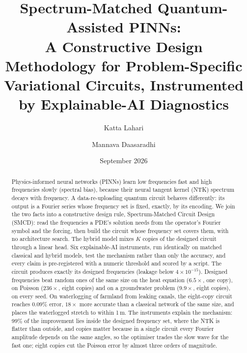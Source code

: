 \documentclass[11pt]{article}
\title{Spectrum-Matched Quantum-Assisted PINNs:\\
  A Constructive Design Methodology for Problem-Specific\\
  Variational Circuits, Instrumented by Explainable-AI Diagnostics}
\author{Katta Lahari \and Mannava Daasaradhi}
\date{September 2026}
\begin{document}
\maketitle

\begin{abstract}
Physics-informed neural networks (PINNs) learn low frequencies fast and high
frequencies slowly (spectral bias), because their neural tangent kernel (NTK) spectrum
decays with frequency. A data-re-uploading quantum circuit behaves differently: its
output is a Fourier series whose frequency set is fixed, exactly, by its encoding. We
join the two facts into a constructive design rule, Spectrum-Matched Circuit Design
(SMCD): read the frequencies a PDE's solution needs from the operator's Fourier symbol
and the forcing, then build the circuit whose frequency set covers them, with no
architecture search. The hybrid model mixes $K$ copies of the designed circuit through a
linear head. Six explainable-AI instruments, run identically on matched classical and
hybrid models, test the mechanism rather than only the accuracy, and every claim is
pre-registered with a numeric threshold and scored by a script. The circuit produces
exactly its designed frequencies (leakage below $4\times10^{-15}$). Designed frequencies
beat random ones of the same size on the heat equation ($6.5\times$, one copy), on
Poisson ($236\times$, eight copies) and on a groundwater problem ($9.9\times$, eight
copies), on every seed. On waterlogging of farmland from leaking canals, the eight-copy
circuit reaches 0.09\% error, $18\times$ more accurate than a classical network of the
same size, and places the waterlogged stretch to within 1\,m. The instruments explain
the mechanism: 99\% of the improvement lies inside the designed frequency set, where the
NTK is flatter than outside, and copies matter because in a single circuit every Fourier
amplitude depends on the same angles, so the optimiser trades the slow wave for the fast
one; eight copies cut the Poisson error by almost three orders of magnitude.
\end{abstract}











\appendix


\renewcommand{\bibfont}{\small}
\setlength{\bibsep}{2pt}


\end{document}
